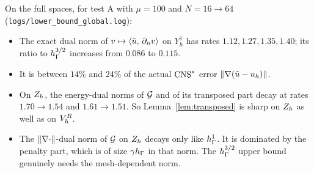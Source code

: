 On the full spaces, for test A with $\mu=100$ and $N=16\to64$ (\texttt{logs/lower\_bound\_global.log}):
\begin{itemize}
\item The exact dual norm of $v\mapsto\langle \tilde u,\, \partial_n v\rangle$ on $Y_h^1$ has rates $1.12,1.27,1.35,1.40$; its ratio to $h_\Gamma^{3/2}$ increases from $0.086$ to $0.115$.
\item It is between $14\%$ and $24\%$ of the actual $\mathrm{CNS}^\ast$ error $\lVert \nabla(\tilde u-u_h)\rVert$.
\item On $Z_h$, the energy-dual norms of $\mathcal G$ and of its transposed part decay at rates $1.70\to1.54$ and $1.61\to1.51$. So Lemma~\ref{lem:transposed} is sharp on $Z_h$ as well as on $V_h^R$.
\item The $\lVert \nabla\cdot\rVert$-dual norm of $\mathcal G$ on $Z_h$ decays only like $h_\Gamma^{1}$. It is dominated by the penalty part, which is of size $\gamma h_\Gamma$ in that norm. The $h_\Gamma^{3/2}$ upper bound genuinely needs the mesh-dependent norm.
\end{itemize}
